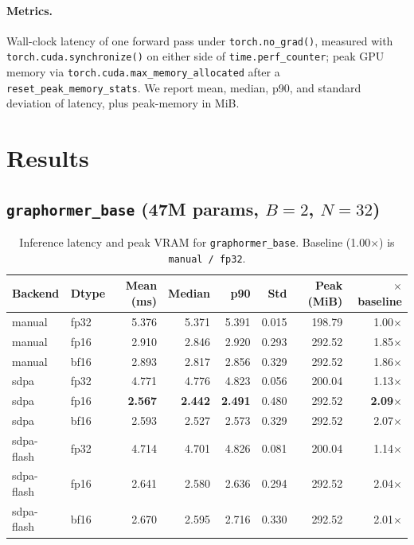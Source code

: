 \documentclass[11pt]{article}
\begin{document}
\paragraph{Metrics.} Wall-clock latency of one forward pass under
\texttt{torch.no\_grad()}, measured with
\texttt{torch.cuda.synchronize()} on either side of
\texttt{time.perf\_counter}; peak GPU memory via
\texttt{torch.cuda.max\_memory\_allocated} after a
\texttt{reset\_peak\_memory\_stats}. We report mean, median, p90, and
standard deviation of latency, plus peak-memory in MiB.

\section{Results}

\subsection{\texttt{graphormer\_base} (47M params, $B{=}2$, $N{=}32$)}

\begin{table}[h!]
\centering
\small
\begin{tabular}{llrrrrrr}
\toprule
\textbf{Backend} & \textbf{Dtype} & \textbf{Mean (ms)} & \textbf{Median} & \textbf{p90} &
\textbf{Std} & \textbf{Peak (MiB)} & \textbf{$\times$ baseline} \\
\midrule
manual     & fp32 & 5.376 & 5.371 & 5.391 & 0.015 & 198.79 & 1.00$\times$ \\
manual     & fp16 & 2.910 & 2.846 & 2.920 & 0.293 & 292.52 & 1.85$\times$ \\
manual     & bf16 & 2.893 & 2.817 & 2.856 & 0.329 & 292.52 & 1.86$\times$ \\
sdpa       & fp32 & 4.771 & 4.776 & 4.823 & 0.056 & 200.04 & 1.13$\times$ \\
sdpa       & fp16 & \textbf{2.567} & \textbf{2.442} & \textbf{2.491} & 0.480 & 292.52 & \textbf{2.09$\times$} \\
sdpa       & bf16 & 2.593 & 2.527 & 2.573 & 0.329 & 292.52 & 2.07$\times$ \\
sdpa-flash & fp32 & 4.714 & 4.701 & 4.826 & 0.081 & 200.04 & 1.14$\times$ \\
sdpa-flash & fp16 & 2.641 & 2.580 & 2.636 & 0.294 & 292.52 & 2.04$\times$ \\
sdpa-flash & bf16 & 2.670 & 2.595 & 2.716 & 0.330 & 292.52 & 2.01$\times$ \\
\bottomrule
\end{tabular}
\caption{Inference latency and peak VRAM for \texttt{graphormer\_base}.
Baseline (1.00$\times$) is \texttt{manual / fp32}.}
\label{tab:base}
\end{table}
\end{document}
